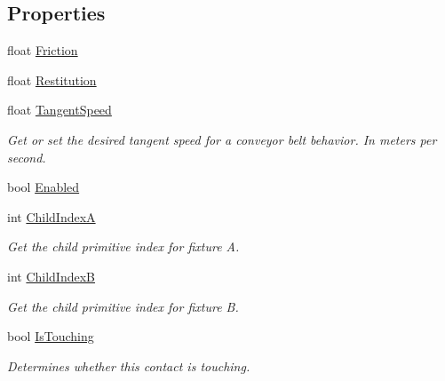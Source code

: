 \subsection*{Properties}
\begin{DoxyCompactItemize}
\item 
float \hyperlink{class_farseer_physics_1_1_dynamics_1_1_contacts_1_1_contact_ac6ee00c35678be16250b1d9efe7ba648}{Friction}
\item 
float \hyperlink{class_farseer_physics_1_1_dynamics_1_1_contacts_1_1_contact_a3028c01a113024dda14c9143b449883a}{Restitution}
\item 
float \hyperlink{class_farseer_physics_1_1_dynamics_1_1_contacts_1_1_contact_a36370ced1defd0156ca5cf00b1b2683f}{Tangent\+Speed}
\begin{DoxyCompactList}\small\item\em Get or set the desired tangent speed for a conveyor belt behavior. In meters per second. \end{DoxyCompactList}\item 
bool \hyperlink{class_farseer_physics_1_1_dynamics_1_1_contacts_1_1_contact_a68233bcbc44a590161f417c6e536480d}{Enabled}
\item 
int \hyperlink{class_farseer_physics_1_1_dynamics_1_1_contacts_1_1_contact_a7d610dcd4c90bc723024de3d7f50db46}{Child\+Index\+A}
\begin{DoxyCompactList}\small\item\em Get the child primitive index for fixture A. \end{DoxyCompactList}\item 
int \hyperlink{class_farseer_physics_1_1_dynamics_1_1_contacts_1_1_contact_ac3620ad558a4219e200de3c519c80652}{Child\+Index\+B}
\begin{DoxyCompactList}\small\item\em Get the child primitive index for fixture B. \end{DoxyCompactList}\item 
bool \hyperlink{class_farseer_physics_1_1_dynamics_1_1_contacts_1_1_contact_ae7147b96fbc97e5784cf23762b8562cd}{Is\+Touching}
\begin{DoxyCompactList}\small\item\em Determines whether this contact is touching. \end{DoxyCompactList}\end{DoxyCompactItemize}


